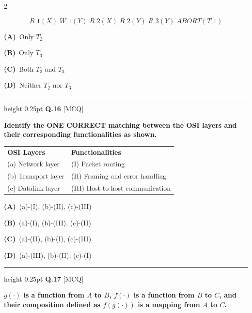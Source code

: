 \documentclass[a4paper,10pt,twoside]{article}
\begin{document}
\begin{multicols}{2}
{\[ R\_1(X) \; W\_1(Y) \; R\_2(X) \; R\_2(Y) \; R\_3(Y) \; ABORT(T\_1) \] \par}
\par\vspace{2pt}\noindent
\textbf{(A)}~Only $T_2$\par\vspace{2pt}\noindent
\textbf{(B)}~Only $T_3$\par\vspace{2pt}\noindent
\textbf{(C)}~Both $T_2$ and $T_3$\par\vspace{2pt}\noindent
\textbf{(D)}~Neither $T_2$ nor $T_3$
\par\vspace{6pt}\hrule height 0.25pt\vspace{6pt}
\noindent\textbf{Q.16} \hfill {\footnotesize\textsf{[MCQ]}}
\par\vspace{2pt}
{\bfseries Identify the ONE CORRECT matching between the OSI layers and their corresponding functionalities as shown.
\par\smallskip
\begin{tabular}{ll}
\textbf{OSI Layers} & \textbf{Functionalities} \\
(a) Network layer & (I) Packet routing \\
(b) Transport layer & (II) Framing and error handling \\
(c) Datalink layer & (III) Host to host communication
\end{tabular} \par}
\par\vspace{2pt}\noindent
\textbf{(A)}~(a)-(I), (b)-(II), (c)-(III)\par\vspace{2pt}\noindent
\textbf{(B)}~(a)-(I), (b)-(III), (c)-(II)\par\vspace{2pt}\noindent
\textbf{(C)}~(a)-(II), (b)-(I), (c)-(III)\par\vspace{2pt}\noindent
\textbf{(D)}~(a)-(III), (b)-(II), (c)-(I)
\par\vspace{6pt}\hrule height 0.25pt\vspace{6pt}
\noindent\textbf{Q.17} \hfill {\footnotesize\textsf{[MCQ]}}
\par\vspace{2pt}
{\bfseries $g(\cdot)$ is a function from $A$ to $B$, $f(\cdot)$ is a function from $B$ to $C$, and their composition defined as $f(g(\cdot))$ is a mapping from $A$ to $C$.
}
\end{multicols}
\end{document}
